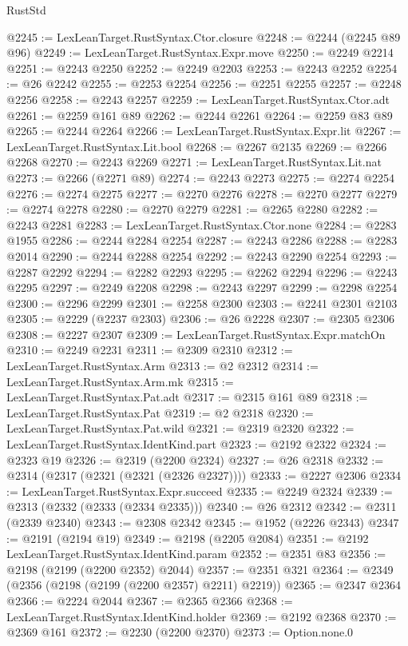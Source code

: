 \begin{lexlean}{RustStd}
\begin{coremodule}
@2245 := LexLeanTarget.RustSyntax.Ctor.closure
@2248 := @2244 (@2245 @89 @96)
@2249 := LexLeanTarget.RustSyntax.Expr.move
@2250 := @2249 @2214
@2251 := @2243 @2250
@2252 := @2249 @2203
@2253 := @2243 @2252
@2254 := @26 @2242
@2255 := @2253 @2254
@2256 := @2251 @2255
@2257 := @2248 @2256
@2258 := @2243 @2257
@2259 := LexLeanTarget.RustSyntax.Ctor.adt
@2261 := @2259 @161 @89
@2262 := @2244 @2261
@2264 := @2259 @83 @89
@2265 := @2244 @2264
@2266 := LexLeanTarget.RustSyntax.Expr.lit
@2267 := LexLeanTarget.RustSyntax.Lit.bool
@2268 := @2267 @2135
@2269 := @2266 @2268
@2270 := @2243 @2269
@2271 := LexLeanTarget.RustSyntax.Lit.nat
@2273 := @2266 (@2271 @89)
@2274 := @2243 @2273
@2275 := @2274 @2254
@2276 := @2274 @2275
@2277 := @2270 @2276
@2278 := @2270 @2277
@2279 := @2274 @2278
@2280 := @2270 @2279
@2281 := @2265 @2280
@2282 := @2243 @2281
@2283 := LexLeanTarget.RustSyntax.Ctor.none
@2284 := @2283 @1955
@2286 := @2244 @2284 @2254
@2287 := @2243 @2286
@2288 := @2283 @2014
@2290 := @2244 @2288 @2254
@2292 := @2243 @2290 @2254
@2293 := @2287 @2292
@2294 := @2282 @2293
@2295 := @2262 @2294
@2296 := @2243 @2295
@2297 := @2249 @2208
@2298 := @2243 @2297
@2299 := @2298 @2254
@2300 := @2296 @2299
@2301 := @2258 @2300
@2303 := @2241 @2301 @2103
@2305 := @2229 (@2237 @2303)
@2306 := @26 @2228
@2307 := @2305 @2306
@2308 := @2227 @2307
@2309 := LexLeanTarget.RustSyntax.Expr.matchOn
@2310 := @2249 @2231
@2311 := @2309 @2310
@2312 := LexLeanTarget.RustSyntax.Arm
@2313 := @2 @2312
@2314 := LexLeanTarget.RustSyntax.Arm.mk
@2315 := LexLeanTarget.RustSyntax.Pat.adt
@2317 := @2315 @161 @89
@2318 := LexLeanTarget.RustSyntax.Pat
@2319 := @2 @2318
@2320 := LexLeanTarget.RustSyntax.Pat.wild
@2321 := @2319 @2320
@2322 := LexLeanTarget.RustSyntax.IdentKind.part
@2323 := @2192 @2322
@2324 := @2323 @19
@2326 := @2319 (@2200 @2324)
@2327 := @26 @2318
@2332 := @2314 (@2317 (@2321 (@2321 (@2326 @2327))))
@2333 := @2227 @2306
@2334 := LexLeanTarget.RustSyntax.Expr.succeed
@2335 := @2249 @2324
@2339 := @2313 (@2332 (@2333 (@2334 @2335)))
@2340 := @26 @2312
@2342 := @2311 (@2339 @2340)
@2343 := @2308 @2342
@2345 := @1952 (@2226 @2343)
@2347 := @2191 (@2194 @19)
@2349 := @2198 (@2205 @2084)
@2351 := @2192 LexLeanTarget.RustSyntax.IdentKind.param
@2352 := @2351 @83
@2356 := @2198 (@2199 (@2200 @2352) @2044)
@2357 := @2351 @321
@2364 := @2349 (@2356 (@2198 (@2199 (@2200 @2357) @2211) @2219))
@2365 := @2347 @2364
@2366 := @2224 @2044
@2367 := @2365 @2366
@2368 := LexLeanTarget.RustSyntax.IdentKind.holder
@2369 := @2192 @2368
@2370 := @2369 @161
@2372 := @2230 (@2200 @2370)
@2373 := Option.none.{0}

\end{coremodule}
\end{lexlean}
